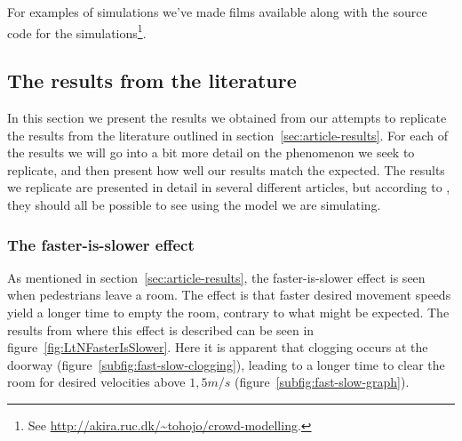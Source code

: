 For examples of simulations we've made films available along with the source 
code for the simulations\footnote{See 
\url{http://akira.ruc.dk/~tohojo/crowd-modelling}.}.

\subsection{The results from the literature}\label{subsec:ThePhenomena}
In this section we present the results we obtained from our attempts
to replicate the results from the literature outlined in 
section~\ref{sec:article-results}.  For each of the results we will go into a 
bit more detail on the phenomenon we seek to replicate, and then present how 
well our results match the expected. The results we replicate are presented in 
detail in several different articles, but according to \cite{self-org}, they 
should all be possible to see using the model we are simulating.

\subsubsection{The faster-is-slower effect}
As mentioned in section~\ref{sec:article-results}, the faster-is-slower effect 
is seen when pedestrians leave a room. The effect is that faster desired 
movement speeds yield a longer time to empty the room, contrary to what might 
be expected. The results from \cite{helbing00} where this effect is described 
can be seen in figure~\ref{fig:LtNFasterIsSlower}. Here it is apparent that 
clogging occurs at the doorway (figure~\ref{subfig:fast-slow-clogging}), 
leading to a longer time to clear the room for desired velocities above 
$1,5m/s$ (figure~\ref{subfig:fast-slow-graph}).

